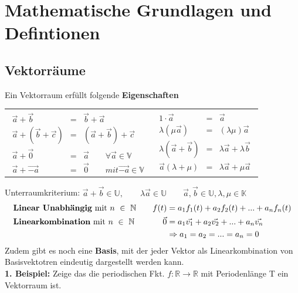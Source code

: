
\section{Mathematische Grundlagen und Defintionen}
\subsection{Vektorräume}
Ein Vektorraum erfüllt folgende \textbf{Eigenschaften}
\begin{tabular}{ll}
 \parbox{5cm}{
\begin{eqnarray*}
\vec{a} + \vec{b} &=& \vec{b} + \vec{a}\\
\vec{a} + (\vec{b} + \vec{c}) &=& (\vec{a} + \vec{b})+ \vec{c}\\
\vec{a} + \vec{0} &=& \vec{a} \qquad \forall \vec{a} \in \mathbb{V}\\
\vec{a} + \vec{-a} &=& \vec{0} \qquad mit  \vec{-a} \in \mathbb{V}
\end{eqnarray*}}
 &
 \parbox{5cm}{
 \begin{eqnarray*}
1 \cdot \vec{a} &=& \vec{a}\\
\lambda(\mu\vec{a}) &=& (\lambda\mu)\vec{a}\\
\lambda (\vec{a} + \vec{b}) &=& \lambda\vec{a} + \lambda\vec{b}\\
\vec{a} (\lambda + \mu) &=& \lambda\vec{a} + \mu\vec{a}
\end{eqnarray*}}
\end{tabular}
Unterraumkriterium: \qquad
$\vec{a}+\vec{b} \in \mathbb{U}, \qquad \lambda \vec{a} \in \mathbb{U} \qquad \vec{a}, \vec{b} \in \mathbb{U}, \lambda,\mu \in \mathbb{K}$
\begin{align*}
&\text{\textbf{Linear Unabhängig} mit}~ n ~\in ~\mathbb{N} \quad  &f(t) &= a_1f_1(t)+a_2f_2(t)+ ... + a_nf_n(t)\\
&\text{\textbf{Linearkombination}  mit}~ n ~\in~ \mathbb{N} \quad &\vec{0} &= a_1\vec{v_1}+a_2\vec{v_2}+ ... + a_n\vec{v_n}\\
&~ &~ &\Rightarrow a_1 = a_2 = ... = a_n = 0
\end{align*}
Zudem gibt es noch eine \textbf{Basis}, mit der jeder Vektor als Linearkombination von Basisvektotren eindeutig dargestellt werden kann. \\
\vspace{6pt}
\textbf{1. Beispiel:} \quad Zeige das die periodischen Fkt. $f:\mathbb{R}\rightarrow \mathbb{R}$ mit Periodenlänge T ein Vektorraum ist.
